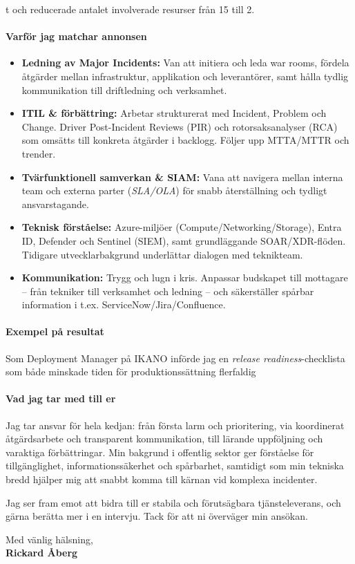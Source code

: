 \documentclass[11pt,a4paper]{article}
\begin{document}
t och reducerade antalet involverade resurser från 15 till 2.
  
\paragraph{Varför jag matchar annonsen}
\begin{itemize}\setlength\itemsep{0.3em}
  \item \textbf{Ledning av Major Incidents:} Van att initiera och leda war rooms, fördela åtgärder mellan infrastruktur, applikation och leverantörer, samt hålla tydlig kommunikation till driftledning och verksamhet.
  \item \textbf{ITIL \& förbättring:} Arbetar strukturerat med Incident, Problem och Change. Driver Post-Incident Reviews (PIR) och rotorsaksanalyser (RCA) som omsätts till konkreta åtgärder i backlogg. Följer upp MTTA/MTTR och trender.
  \item \textbf{Tvärfunktionell samverkan \& SIAM:} Vana att navigera mellan interna team och externa parter (\textit{SLA/OLA}) för snabb återställning och tydligt ansvarstagande.
  \item \textbf{Teknisk förståelse:} Azure-miljöer (Compute/Networking/Storage), Entra ID, Defender och Sentinel (SIEM), samt grundläggande SOAR/XDR-flöden. Tidigare utvecklarbakgrund underlättar dialogen med teknikteam.
  \item \textbf{Kommunikation:} Trygg och lugn i kris. Anpassar budskapet till mottagare – från tekniker till verksamhet och ledning – och säkerställer spårbar information i t.ex. ServiceNow/Jira/Confluence.
\end{itemize}

\paragraph{Exempel på resultat}

  \item Som Deployment Manager på IKANO införde jag en \textit{release readiness}-checklista som både minskade tiden för produktionssättning flerfaldig


\paragraph{Vad jag tar med till er}
Jag tar ansvar för hela kedjan: från första larm och prioritering, via koordinerat åtgärdsarbete och transparent kommunikation, till lärande uppföljning och varaktiga förbättringar. Min bakgrund i offentlig sektor ger förståelse för tillgänglighet, informationssäkerhet och spårbarhet, samtidigt som min tekniska bredd hjälper mig att snabbt komma till kärnan vid komplexa incidenter.

Jag ser fram emot att bidra till er stabila och förutsägbara tjänsteleverans, och gärna berätta mer i en intervju. Tack för att ni överväger min ansökan.

\vspace{1em}
Med vänlig hälsning,\\[0.5em]
\textbf{Rickard Åberg}
\end{document}
